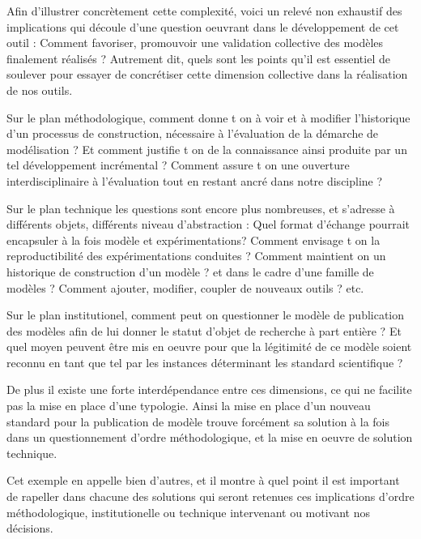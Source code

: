 Afin d'illustrer concrètement cette complexité, voici un relevé non exhaustif des implications qui découle d'une question oeuvrant dans le développement de cet outil : Comment favoriser, promouvoir une validation collective des modèles finalement réalisés ? Autrement dit, quels sont les points qu'il est essentiel de soulever pour essayer de concrétiser cette dimension collective dans la réalisation de nos outils.

Sur le plan méthodologique, comment donne t on à voir et à modifier l'historique d'un processus de construction, nécessaire à l'évaluation de la démarche de modélisation ? Et comment justifie t on de la connaissance ainsi produite par un tel développement incrémental ? Comment assure t on une ouverture interdisciplinaire à l'évaluation tout en restant ancré dans notre discipline ?

Sur le plan technique les questions sont encore plus nombreuses, et s'adresse à différents objets, différents niveau d'abstraction : Quel format d'échange pourrait encapsuler à la fois modèle et expérimentations? Comment envisage t on la reproductibilité des expérimentations conduites ? Comment maintient on un historique de construction d'un modèle ? et dans le cadre d'une famille de modèles ? Comment ajouter, modifier, coupler de nouveaux outils ? etc.  

Sur le plan institutionel, comment peut on questionner le modèle de publication des modèles afin de lui donner le statut d'objet de recherche à part entière ?  Et quel moyen peuvent être mis en oeuvre pour que la légitimité de ce modèle soient reconnu en tant que tel par les instances déterminant les standard scientifique ? 

De plus il existe une forte interdépendance entre ces dimensions, ce qui ne facilite pas la mise en place d'une typologie. Ainsi la mise en place d'un nouveau standard pour la publication de modèle trouve forcément sa solution à la fois dans un questionnement d'ordre méthodologique, et la mise en oeuvre de solution technique. 

Cet exemple en appelle bien d'autres, et il montre à quel point il est important de rapeller dans chacune des solutions qui seront retenues ces implications d'ordre méthodologique, institutionelle ou technique intervenant ou motivant nos décisions.

